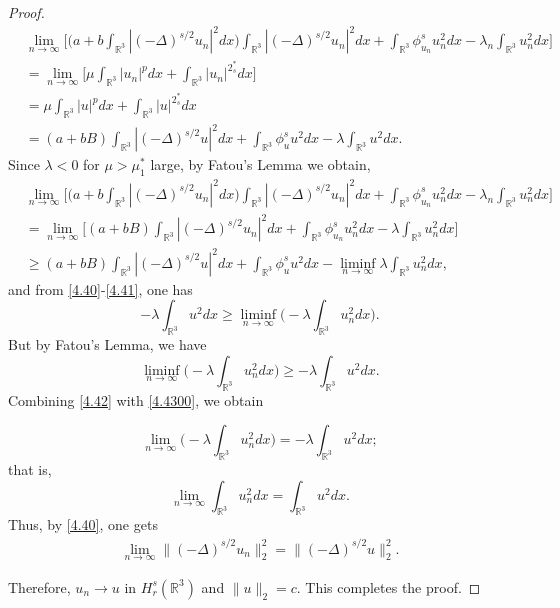 \documentclass[10pt,a4paper]{amsart}
\numberwithin{equation}{section}
\begin{document}
\begin{proof}
\begin{equation}\label{4.40}
\begin{split}
&\lim_{n\to\infty}\Big[\Big(a+b\int_{\mathbb{R}^3}|(-\Delta)^{s/2}u_n|^2dx\Big)
\int_{\mathbb{R}^3}|(-\Delta)^{s/2}u_n|^2 dx+\int_{\mathbb{R}^3}\phi^s_{u_n}{u^2_n}dx
-\lambda_n \int_{\mathbb{R}^3} {u^2_n} dx\Big]\\
&=\lim_{n\to\infty} \Big[\mu \int_{\mathbb{R}^3}|u_n|^{p}dx
 +\int_{\mathbb{R}^3}|u_n|^{2^*_s} dx\Big]\\
&=\mu \int_{\mathbb{R}^3}|u|^{p}dx+\int_{\mathbb{R}^3}|u|^{2^*_s} dx\\
&=(a+bB)\int_{\mathbb{R}^3}|(-\Delta)^{s/2}u|^2 dx+\int_{\mathbb{R}^3}\phi^s_{u}{u^2}dx
 -\lambda \int_{\mathbb{R}^3} {u^2} dx.
\end{split}
\end{equation}
Since $\lambda<0$ for $\mu>\mu^*_1$ large,  by Fatou's Lemma we obtain,
\begin{equation}\label{4.41}
\begin{split}
&\lim_{n\to\infty}\Big[\Big(a+b\int_{\mathbb{R}^3}|(-\Delta)^{s/2}u_n|^2dx\Big)
 \int_{\mathbb{R}^3}|(-\Delta)^{s/2}u_n|^2 dx
 +\int_{\mathbb{R}^3}\phi^s_{u_n}{u^2_n}dx-\lambda_n \int_{\mathbb{R}^3} {u^2_n} dx\Big]\\
&=\lim_{n\to\infty}\Big[(a+bB)\int_{\mathbb{R}^3}|(-\Delta)^{s/2}u_n|^2 dx
 +\int_{\mathbb{R}^3}\phi^s_{u_n}{u^2_n}dx-\lambda \int_{\mathbb{R}^3} {u^2_n} dx\Big]\\
&\geq (a+bB)\int_{\mathbb{R}^3}|(-\Delta)^{s/2}u|^2 dx
 +\int_{\mathbb{R}^3}\phi^s_{u}{u^2}dx-\liminf_{n\to\infty}\lambda 
 \int_{\mathbb{R}^3} {u^2_n} dx,
\end{split}
\end{equation}
and from \eqref{4.40}-\eqref{4.41}, one has
\begin{equation}\label{4.42}
-\lambda \int_{\mathbb{R}^3} {u^2} dx\geq\liminf_{n\to\infty}
 \Big(-\lambda \int_{\mathbb{R}^3} {u^2_n} dx\Big).
\end{equation}
But by Fatou's Lemma, we have
\begin{equation}\label{4.4300}
 \liminf_{n\to\infty}\Big(-\lambda\int_{\mathbb{R}^3} {u^2_n} dx\Big)
 \geq-\lambda \int_{\mathbb{R}^3} {u^2} dx.
\end{equation}
Combining \eqref{4.42} with \eqref{4.4300}, we obtain

\[ 
\lim_{n\to\infty}\Big(-\lambda \int_{\mathbb{R}^3} {u^2_n} dx\Big)
=-\lambda \int_{\mathbb{R}^3} {u^2} dx;
\]
that is,
\[ 
\lim_{n\to\infty} \int_{\mathbb{R}^3} {u^2_n} dx= \int_{\mathbb{R}^3} {u^2} dx.
\]
Thus, by \eqref{4.40}, one gets
\[ 
\begin{split}
\lim_{n\to\infty}  \|(-\Delta)^{s/2}u_n\|^2_2 = \|(-\Delta)^{s/2}u\|^2_2.
\end{split}
\]

Therefore, $u_n\to u$ in $H^s_{r}(\mathbb{R}^3)$ and $\|u\|_2=c$.
 This completes the proof.
\end{proof}
\end{document}

